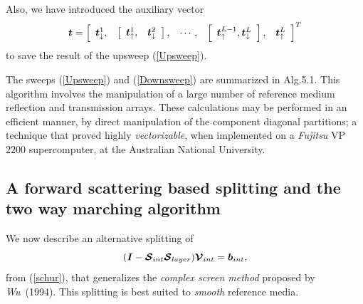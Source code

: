 Also, we have introduced the auxiliary vector
\begin{equation} \label{tdef}
{\mbox{\boldmath$\mit t$\unboldmath}}=\left[{\begin{array}{ccccc}
{\mbox{\boldmath$\mit t$\unboldmath}}_{ \downarrow }^{1},&
\left[{\begin{array}{cc}
{\mbox{\boldmath$\mit t$\unboldmath}}_{ \uparrow }^{1},&
{\mbox{\boldmath$\mit t$\unboldmath}}_{ \downarrow }^{2}\end{array}}\right],&
\cdots,&
\left[{\begin{array}{cc}
{\mbox{\boldmath$\mit t$\unboldmath}}_{ \uparrow }^{L-1},
{\mbox{\boldmath$\mit t$\unboldmath}}_{ \downarrow }^{L}\end{array}}\right],&
{\mbox{\boldmath$\mit t$\unboldmath}}_{ \uparrow }^{L}\end{array}}\right]^{T}
\end{equation}
to save the result of the upsweep (\ref{Upsweep}). 

The sweeps (\ref{Upsweep}) and (\ref{Downsweep}) are summarized in  Alg.5.1.
This algorithm  involves the manipulation of a large number of reference 
medium reflection and transmission arrays. These calculations may be performed in an efficient manner, 
by direct manipulation of the component diagonal partitions; a technique 
that proved highly {\em vectorizable\/}, when implemented on a {\em Fujitsu\/} 
VP$2200$ supercomputer, at the Australian National University.
 










\subsection[forward scattering based splitting]
{A  forward scattering based splitting  and the two way 
marching algorithm}\label{fscat}

We now describe an alternative splitting of 
\[
({\mbox{\boldmath$\mit I$\unboldmath}}-{\mbox{\boldmath$\cal S$\unboldmath}}_{{int}}{\mbox{\boldmath$\cal S$\unboldmath}}_{{layer}}){\mbox{\boldmath$\cal V$\unboldmath}}_{{int}}={\mbox{\boldmath$\mit b$\unboldmath}}_{{int}},
\]
from (\ref{schur}), that generalizes the {\em complex screen method\/} proposed by {\em 
Wu\/}~(1994). This splitting  is best suited to {\em smooth\/} reference 
media.


